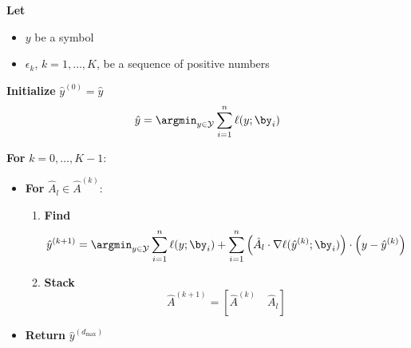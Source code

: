 \textbf{Let}
\begin{itemize}
	\item \(y\) be a symbol
	\item \(\epsilon_k\), \(k=1,\dots,K\), be a sequence of positive numbers
\end{itemize}

\textbf{Initialize} \(\hat{y}^{(0)} = \hat{y}\)
%
\[
	\hat{y} = \argmin_{y \in \mathcal{Y}} \sum_{i=1}^n \ell(y;\by_i)
\]
%

\textbf{For} \(k = 0,\dots,K-1\):
\begin{itemize}
	\item[] \textbf{For} \(\hat{A}_l \in \hat{A}^{(k)}\):
	\begin{enumerate}
		\item \textbf{Find}
		\[
			\hat{y}^{(k+1)} = \argmin_{y \in \mathcal{Y}} \sum_{i=1}^n \ell(y;\by_i) + \sum_{i=1}^n \left( \hat{A}_l \cdot \nabla \ell(\hat{y}^{(k)};\by_i) \right) \cdot \left( y - \hat{y}^{(k)} \right)
		\]
		\item \textbf{Stack}
		\[
			\hat{A}^{(k+1)} = \left[ \hat{A}^{(k)} \quad \hat{A}_l \right]
		\]
	\end{enumerate}

	\item[] \textbf{Return} \(\hat{y}^{(d_{\max})}\)
\end{itemize}
